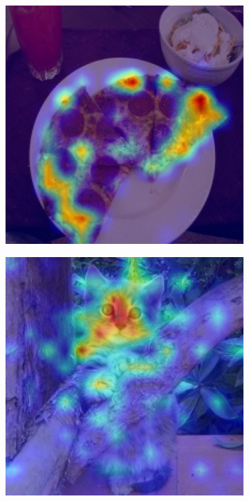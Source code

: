 \begin{figure}[t]
\begin{subfigure}[b]{0.19\textwidth}
        \includegraphics[width=1\textwidth]{figures/qualitative_results/ILSVRC2012_val_00018461_deit_small_patch16_224.JPEG}
    \end{subfigure}  
    \begin{subfigure}[b]{0.19\textwidth}
        \centering
        \includegraphics[width=1\textwidth]{figures/qualitative_results/ILSVRC2012_val_00023779_resmlp_24_224.JPEG}

\end{subfigure}
\end{figure}

